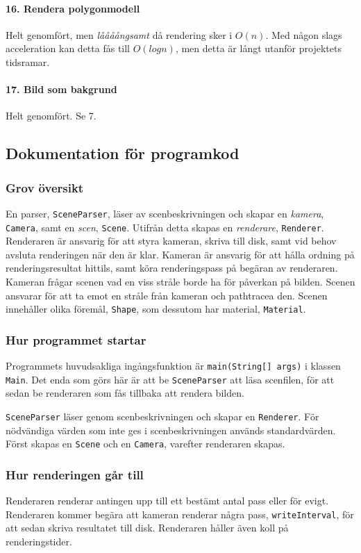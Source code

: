 \documentclass{article}
\begin{document}
\paragraph{16. Rendera polygonmodell}
Helt genomfört, men \emph{låååångsamt} då rendering sker i $O(n)$. Med
någon slags acceleration kan detta fås till $O(log n)$, men detta är
långt utanför projektets tidsramar.

\paragraph{17. Bild som bakgrund}
Helt genomfört. Se 7.

\subsection{Dokumentation för programkod}
\subsubsection{Grov översikt}
En parser, \texttt{SceneParser}, läser av scenbeskrivningen och skapar
en \emph{kamera}, \texttt{Camera}, samt en \emph{scen},
\texttt{Scene}. Utifrån detta skapas en \emph{renderare},
\texttt{Renderer}. Renderaren är ansvarig för att styra kameran,
skriva till disk, samt vid behov avsluta renderingen när den är
klar. Kameran är ansvarig för att hålla ordning på renderingsresultat
hittils, samt köra renderingspass på begäran av renderaren. Kameran
frågar scenen vad en viss stråle borde ha för påverkan på
bilden. Scenen ansvarar för att ta emot en stråle från kameran och
pathtracea den. Scenen innehåller olika föremål, \texttt{Shape}, som
dessutom har material, \texttt{Material}.

\subsubsection{Hur programmet startar}
Programmets huvudsakliga ingångsfunktion är \texttt{main(String[]
  args)} i klassen \texttt{Main}. Det enda som görs här är att be
\texttt{SceneParser} att läsa scenfilen, för att sedan be renderaren
som fås tillbaka att rendera bilden.

\texttt{SceneParser} läser genom scenbeskrivningen och skapar en
\texttt{Renderer}. För nödvändiga värden som inte ges i
scenbeskrivningen används standardvärden. Först skapas en
\texttt{Scene} och en \texttt{Camera}, varefter renderaren skapas.

\subsubsection{Hur renderingen går till}
Renderaren renderar antingen upp till ett bestämt antal pass eller för
evigt. Renderaren kommer begära att kameran renderar några pass,
\texttt{writeInterval}, för att sedan skriva resultatet till
disk. Renderaren håller även koll på renderingstider.
\end{document}
